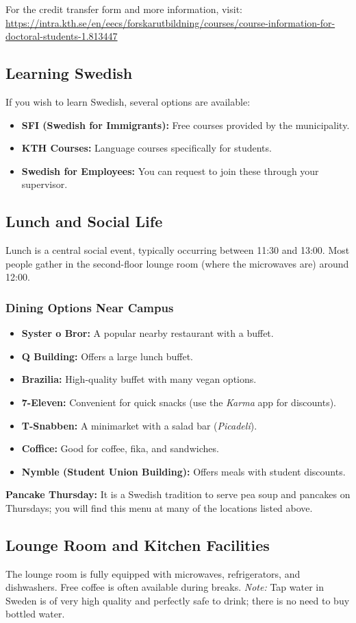 For the credit transfer form and more information, visit:
\url{https://intra.kth.se/en/eecs/forskarutbildning/courses/course-information-for-doctoral-students-1.813447}

\subsection{Learning Swedish}
If you wish to learn Swedish, several options are available:
\begin{itemize}
    \item \textbf{SFI (Swedish for Immigrants):} Free courses provided by the municipality.
    \item \textbf{KTH Courses:} Language courses specifically for students.
    \item \textbf{Swedish for Employees:} You can request to join these through your supervisor.
\end{itemize}

\subsection{Lunch and Social Life}
Lunch is a central social event, typically occurring between 11:30 and 13:00. Most people gather in the second-floor lounge room (where the microwaves are) around 12:00.

\subsubsection{Dining Options Near Campus}
\begin{itemize}
    \item \textbf{Syster o Bror:} A popular nearby restaurant with a buffet.
    \item \textbf{Q Building:} Offers a large lunch buffet.
    \item \textbf{Brazilia:} High-quality buffet with many vegan options.
    \item \textbf{7-Eleven:} Convenient for quick snacks (use the \textit{Karma} app for discounts).
    \item \textbf{T-Snabben:} A minimarket with a salad bar (\textit{Picadeli}).
    \item \textbf{Coffice:} Good for coffee, fika, and sandwiches.
    \item \textbf{Nymble (Student Union Building):} Offers meals with student discounts.
\end{itemize}

\textbf{Pancake Thursday:} It is a Swedish tradition to serve pea soup and pancakes on Thursdays; you will find this menu at many of the locations listed above.

\subsection{Lounge Room and Kitchen Facilities}
The lounge room is fully equipped with microwaves, refrigerators, and dishwashers. Free coffee is often available during breaks.
\textit{Note:} Tap water in Sweden is of very high quality and perfectly safe to drink; there is no need to buy bottled water.
